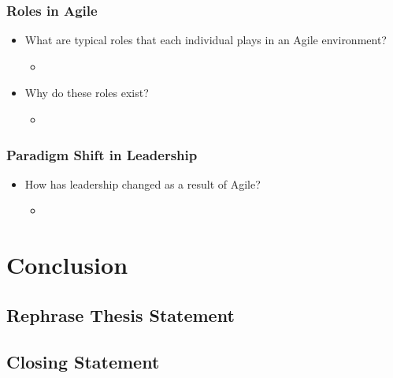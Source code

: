 \documentclass[11pt,a4paper]{article}
\begin{document}
		\subsubsection{Roles in Agile}
		\begin{itemize}[noitemsep]
			\item What are typical roles that each individual plays in an Agile environment?
			\begin{itemize}
				\item
			\end{itemize}
			\item Why do these roles exist?
			\begin{itemize}
				\item
			\end{itemize}
		\end{itemize}
		\subsubsection{Paradigm Shift in Leadership}
		\begin{itemize}[noitemsep]
			\item How has leadership changed as a result of Agile?
			\begin{itemize}
				\item 
			\end{itemize}
		\end{itemize}

\section{Conclusion}
	\subsection{Rephrase Thesis Statement}
	\subsection{Closing Statement}

\newpage
\end{document}
